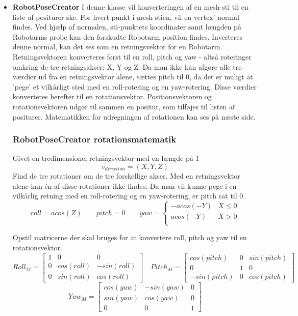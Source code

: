 {\begin{itemize}
\item{\textbf{RobotPoseCreator}}\newline
I denne klasse vil konverteringen af en mesh-sti til en liste af positurer ske.
For hvert punkt i mesh-stien, vil en vertex' normal findes. 
Ved hjælp af normalen, sti-punktets koordinater samt længden på Robotarms probe kan den forskudte Robotarm position findes.
Inverteres denne normal, kan det ses som en retningsvektor for en Robotarm.
Retningsvektoren konverteres først til en roll, pitch og yaw - altså roteringer omkring de tre retningsakser; X, Y og Z.
Da man ikke kan afgøre alle tre værdier ud fra en retningsvektor alene, sættes pitch til 0, da det er muligt at 'pege' et vilkårligt sted med en roll-rotering og en yaw-rotering. Disse værdier konverteres herefter til en rotationsvektor.
Positionsvektoren og rotationsvektoren udgør til sammen en positur, som tilføjes til listen af positurer. Matematikken for udregningen af rotationen kan ses på næste side.
\newpage

\subsubsection{RobotPoseCreator rotationsmatematik}{\label {rotationsmatematik}}
Givet en tredimensionel retningsvektor med en længde på 1
$$
v_{direction} = (X, Y, Z)
$$
Find de tre rotationer om de tre forskellige akser. Med en retningsvektor alene kan én af disse rotationer ikke findes. Da man vil kunne pege i en vilkårlig retning med en roll-rotering og en yaw-rotering, er pitch sat til 0.
$$ 
roll = acos(Z) \qquad 
pitch = 0 \qquad 
yaw = \begin{cases} 
	-acos(-Y) & X \leq 0\\
	acos(-Y)  & X > 0 \\
\end{cases}
$$

Opstil matricerne der skal bruges for at konvertere roll, pitch og yaw til en rotationsvektor.
$$ 
Roll_M = \begin{bmatrix}
    1 & 0 & 0 \\
    0 & cos(roll) & -sin(roll) \\
    0 & sin(roll) & cos(roll)
\end{bmatrix}
\quad
Pitch_M = \begin{bmatrix}
    cos(pitch) & 0 & sin(pitch) \\
    0 & 1 & 0 \\
    -sin(pitch) & 0 & cos(pitch)
\end{bmatrix} 
$$
$$
Yaw_M = \begin{bmatrix}
    cos(yaw) & -sin(yaw) & 0 \\
    sin(yaw) & cos(yaw) & 0 \\
    0 & 0 & 1
\end{bmatrix}
$$ 


\end{itemize}}
